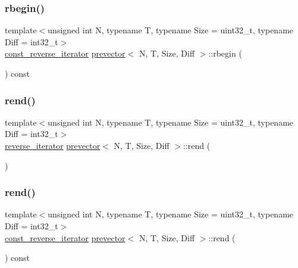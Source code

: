 \mbox{\label{classprevector_ac4c23aba698c67457c435b16ce63033d}} 
\subsubsection{\texorpdfstring{rbegin()}{rbegin()}\hspace{0.1cm}{\footnotesize\ttfamily [2/2]}}
{\footnotesize\ttfamily template$<$unsigned int N, typename T, typename Size = uint32\+\_\+t, typename Diff = int32\+\_\+t$>$ \\
\mbox{\hyperlink{classprevector_1_1const__reverse__iterator}{const\+\_\+reverse\+\_\+iterator}} \mbox{\hyperlink{classprevector}{prevector}}$<$ N, T, Size, Diff $>$\+::rbegin (\begin{DoxyParamCaption}{ }\end{DoxyParamCaption}) const\hspace{0.3cm}{\ttfamily [inline]}}

\mbox{\label{classprevector_a6653d7df565bf668685a418714e3d712}} 
\subsubsection{\texorpdfstring{rend()}{rend()}\hspace{0.1cm}{\footnotesize\ttfamily [1/2]}}
{\footnotesize\ttfamily template$<$unsigned int N, typename T, typename Size = uint32\+\_\+t, typename Diff = int32\+\_\+t$>$ \\
\mbox{\hyperlink{classprevector_1_1reverse__iterator}{reverse\+\_\+iterator}} \mbox{\hyperlink{classprevector}{prevector}}$<$ N, T, Size, Diff $>$\+::rend (\begin{DoxyParamCaption}{ }\end{DoxyParamCaption})\hspace{0.3cm}{\ttfamily [inline]}}

\mbox{\label{classprevector_add100a152fc099570286a8ba856ad5f2}} 
\subsubsection{\texorpdfstring{rend()}{rend()}\hspace{0.1cm}{\footnotesize\ttfamily [2/2]}}
{\footnotesize\ttfamily template$<$unsigned int N, typename T, typename Size = uint32\+\_\+t, typename Diff = int32\+\_\+t$>$ \\
\mbox{\hyperlink{classprevector_1_1const__reverse__iterator}{const\+\_\+reverse\+\_\+iterator}} \mbox{\hyperlink{classprevector}{prevector}}$<$ N, T, Size, Diff $>$\+::rend (\begin{DoxyParamCaption}{ }\end{DoxyParamCaption}) const\hspace{0.3cm}{\ttfamily [inline]}}


